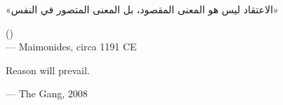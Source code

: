 \begin{flushright}
\begin{Arabic}
«الاعتقاد ليس هو المعنى المقصود، بل المعنى المتصور في النفس»
\end{Arabic}

\vspace{0.3em}
()\\
— Maimonides, circa 1191 CE
\end{flushright}

\vspace{2em}

\begin{flushright}
\begin{hangleftquote}{\QENOpen}{\QENClose}
Reason will prevail.
\end{hangleftquote}
\par\smallskip
\normalfont — The Gang, 2008
\end{flushright}
